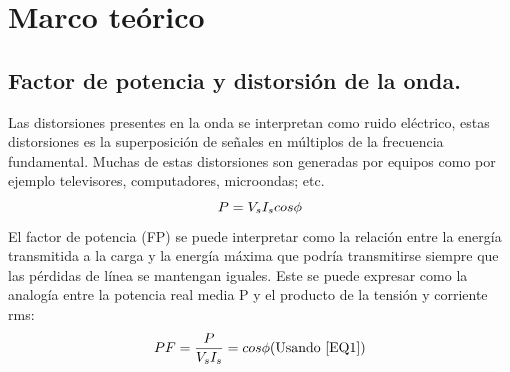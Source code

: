 \newpage{\clearpage}
\chapter{ Marco te\'{o}rico}

\section{Factor de potencia y distorsión de la onda.}
Las distorsiones presentes en la onda se interpretan como ruido eléctrico, estas distorsiones es la superposición de señales en múltiplos de la frecuencia fundamental. Muchas de estas distorsiones son generadas por equipos como por ejemplo televisores, computadores, microondas; etc.\\
\begin{equation}\label{EQ1}
P=V_{s}I_{s}cos \phi\\
\end{equation}
El factor de potencia (FP) se puede interpretar como la relación entre la energía transmitida a la carga y la energía máxima que podría transmitirse siempre que las pérdidas de línea se mantengan iguales. \cite{A30} Este se puede expresar como la analogía entre la potencia real media P y el producto de la tensión y corriente rms:\\
\begin{equation}\label{EQ2}
PF=\frac{P}{V_{s}I_{s}}=cos\phi\\
$(Usando \ref{EQ1})$  \\
\end{equation} 

